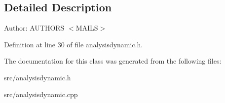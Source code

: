 \subsection{Detailed Description}
\begin{Desc}
\item[Author:]AUTHORS $<$MAILS$>$ \end{Desc}


Definition at line 30 of file analysisdynamic.h.

The documentation for this class was generated from the following files:\begin{CompactItemize}
\item 
src/analysisdynamic.h\item 
src/analysisdynamic.cpp\end{CompactItemize}

